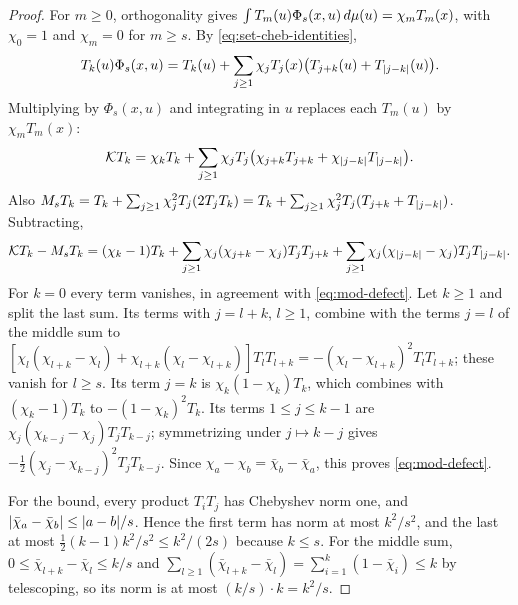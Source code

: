 \begin{proof}
For $m\ge0$, orthogonality gives $\int T_m(u)\Phi_s(x,u)\,d\mu(u)=
\chi_mT_m(x)$, with $\chi_0=1$ and $\chi_m=0$ for $m\ge s$. By
\eqref{eq:set-cheb-identities},
\[
  T_k(u)\Phi_s(x,u)=T_k(u)+\sum_{j\ge1}\chi_jT_j(x)
  \bigl(T_{j+k}(u)+T_{\lvert j-k\rvert}(u)\bigr).
\]
Multiplying by $\Phi_s(x,u)$ and integrating in $u$ replaces each $T_m(u)$
by $\chi_mT_m(x)$:
\[
  \mathcal KT_k=\chi_kT_k+\sum_{j\ge1}\chi_jT_j
  \bigl(\chi_{j+k}T_{j+k}+\chi_{\lvert j-k\rvert}T_{\lvert j-k\rvert}\bigr).
\]
Also $M_sT_k=T_k+\sum_{j\ge1}\chi_j^2T_j(2T_jT_k)=T_k+\sum_{j\ge1}\chi_j^2T_j
(T_{j+k}+T_{\lvert j-k\rvert})$. Subtracting,
\[
  \mathcal KT_k-M_sT_k=(\chi_k-1)T_k
  +\sum_{j\ge1}\chi_j(\chi_{j+k}-\chi_j)T_jT_{j+k}
  +\sum_{j\ge1}\chi_j(\chi_{\lvert j-k\rvert}-\chi_j)T_jT_{\lvert j-k\rvert}.
\]
For $k=0$ every term vanishes, in agreement with \eqref{eq:mod-defect}. Let
$k\ge1$ and split the last sum. Its terms with $j=l+k$, $l\ge1$, combine with
the terms $j=l$ of the middle sum to
$[\chi_l(\chi_{l+k}-\chi_l)+\chi_{l+k}(\chi_l-\chi_{l+k})]T_lT_{l+k}
=-(\chi_l-\chi_{l+k})^2T_lT_{l+k}$; these vanish for $l\ge s$. Its term
$j=k$ is $\chi_k(1-\chi_k)T_k$, which combines with $(\chi_k-1)T_k$ to
$-(1-\chi_k)^2T_k$. Its terms $1\le j\le k-1$ are
$\chi_j(\chi_{k-j}-\chi_j)T_jT_{k-j}$; symmetrizing under $j\mapsto k-j$
gives $-\frac12(\chi_j-\chi_{k-j})^2T_jT_{k-j}$. Since
$\chi_a-\chi_b=\bar\chi_b-\bar\chi_a$, this proves \eqref{eq:mod-defect}.

For the bound, every product $T_iT_j$ has Chebyshev norm one, and
$\lvert \bar\chi_a-\bar\chi_b\rvert\le\lvert a-b\rvert/s$. Hence the first term has norm
at most $k^2/s^2$, and the last at most $\frac12(k-1)k^2/s^2\le k^2/(2s)$
because $k\le s$. For the middle sum, $0\le\bar\chi_{l+k}-\bar\chi_l\le k/s$
and $\sum_{l\ge1}(\bar\chi_{l+k}-\bar\chi_l)=\sum_{i=1}^k(1-\bar\chi_i)\le
k$ by telescoping, so its norm is at most $(k/s)\cdot k=k^2/s$.
\end{proof}

